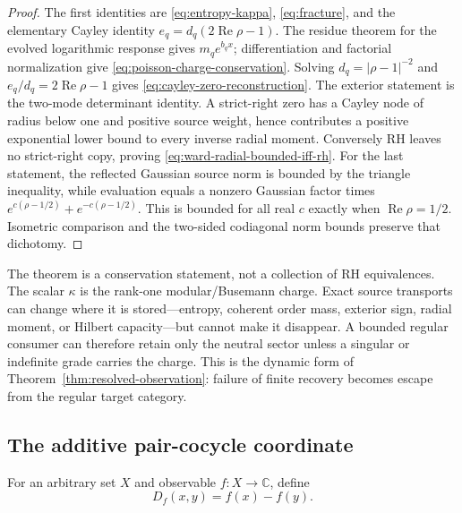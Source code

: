 \documentclass[11pt]{article}
\theoremstyle{definition}
\theoremstyle{remark}
\newcommand{\C}{\mathbb C}
\newcommand{\Rea}{\operatorname{Re}}
\begin{document}
\begin{proof}
The first identities are
\eqref{eq:entropy-kappa}, \eqref{eq:fracture}, and the elementary Cayley
identity \(e_q=d_q(2\Rea\rho-1)\).  The residue theorem for the evolved
logarithmic response gives \(m_qe^{b_qx}\); differentiation and factorial
normalization give \eqref{eq:poisson-charge-conservation}.  Solving
\(d_q=|\rho-1|^{-2}\) and \(e_q/d_q=2\Rea\rho-1\) gives
\eqref{eq:cayley-zero-reconstruction}.  The exterior statement is the
two-mode determinant identity.  A strict-right zero has a Cayley node of
radius below one and positive source weight, hence contributes a positive
exponential lower bound to every inverse radial moment.  Conversely RH
leaves no strict-right copy, proving \eqref{eq:ward-radial-bounded-iff-rh}.
For the last statement, the reflected Gaussian source norm is bounded by
the triangle inequality, while evaluation equals a nonzero Gaussian factor
times \(e^{c(\rho-1/2)}+e^{-c(\rho-1/2)}\).  This is bounded for all real
\(c\) exactly when \(\Rea\rho=1/2\).  Isometric comparison and the
two-sided codiagonal norm bounds preserve that dichotomy.
\end{proof}

The theorem is a conservation statement, not a collection of RH
equivalences.  The scalar \(\kappa\) is the rank-one modular/Busemann charge.
Exact source transports can change where it is stored---entropy, coherent
order mass, exterior sign, radial moment, or Hilbert capacity---but cannot
make it disappear.  A bounded regular consumer can therefore retain only
the neutral sector unless a singular or indefinite grade carries the charge.
This is the dynamic form of
Theorem~\ref{thm:resolved-observation}: failure of finite recovery becomes
escape from the regular target category.

\subsection{The additive pair-cocycle coordinate}

For an arbitrary set \(X\) and observable \(f:X\to\C\), define
\[
                         D_f(x,y)=f(x)-f(y).
\tag{4.16G}\label{eq:pair-descent-defect}
\]
\end{document}
